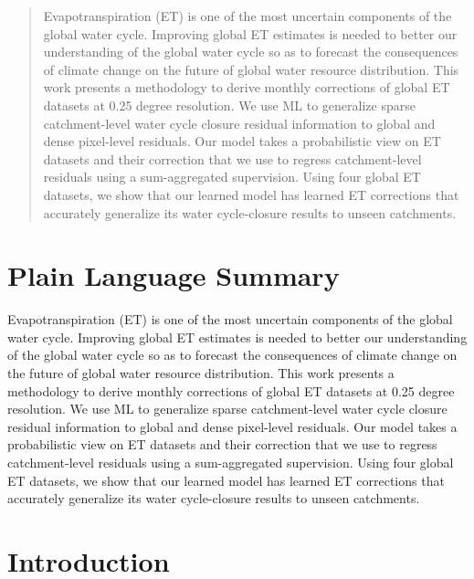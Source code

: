 \documentclass[draft]{agujournal2019}
\begin{document}
\begin{abstract}

Evapotranspiration (ET) is one of the most uncertain components of the global water cycle.
Improving global ET estimates is needed to better our understanding 
of the global water cycle so as to forecast the consequences of climate change 
on the future of global water resource distribution.
This work presents a methodology to derive monthly corrections of global ET datasets at 0.25 degree resolution. 
We use ML to generalize sparse catchment-level water cycle closure residual information to global and dense pixel-level residuals. 
Our model takes a probabilistic view on ET datasets and their correction that we use to 
regress catchment-level residuals using a sum-aggregated supervision. 
Using four global ET datasets, we show that our learned model has learned 
ET corrections that accurately generalize its water cycle-closure results to unseen catchments.
\end{abstract}

\section*{Plain Language Summary}

Evapotranspiration (ET) is one of the most uncertain components of the global water cycle.
Improving global ET estimates is needed to better our understanding 
of the global water cycle so as to forecast the consequences of climate change 
on the future of global water resource distribution.
This work presents a methodology to derive monthly corrections of global ET datasets at 0.25 degree resolution. 
We use ML to generalize sparse catchment-level water cycle closure residual information to global and dense pixel-level residuals. 
Our model takes a probabilistic view on ET datasets and their correction that we use to 
regress catchment-level residuals using a sum-aggregated supervision. 
Using four global ET datasets, we show that our learned model has learned 
ET corrections that accurately generalize its water cycle-closure results to unseen catchments.


%
%

\section{Introduction}
\end{document}
